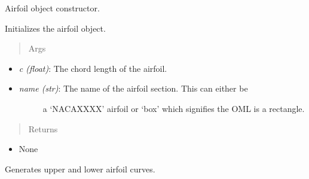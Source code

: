 \documentclass[letterpaper,10pt,english]{sphinxmanual}
\begin{document}
\begin{fulllineitems}
\begin{itemize}
\begin{description}
\end{description}

\end{itemize}

\begin{fulllineitems}
\label{aerodynamics:AeroComBAT.Aerodynamics.Airfoil.__init__}
Airfoil object constructor.

Initializes the airfoil object.
\begin{quote}\begin{description}
\item[{Args}] \leavevmode
\end{description}\end{quote}
\begin{itemize}
\item {} 
\emph{c (float)}: The chord length of the airfoil.

\item {} \begin{description}
\item[{\emph{name (str)}: The name of the airfoil section. This can either be }] \leavevmode
a `NACAXXXX' airfoil or `box' which signifies the OML is a
rectangle.

\end{description}

\end{itemize}
\begin{quote}\begin{description}
\item[{Returns}] \leavevmode
\end{description}\end{quote}
\begin{itemize}
\item {} 
None

\end{itemize}

\end{fulllineitems}


\begin{fulllineitems}
\label{aerodynamics:AeroComBAT.Aerodynamics.Airfoil.points}
Generates upper and lower airfoil curves.


\end{fulllineitems}
\end{fulllineitems}
\end{document}
